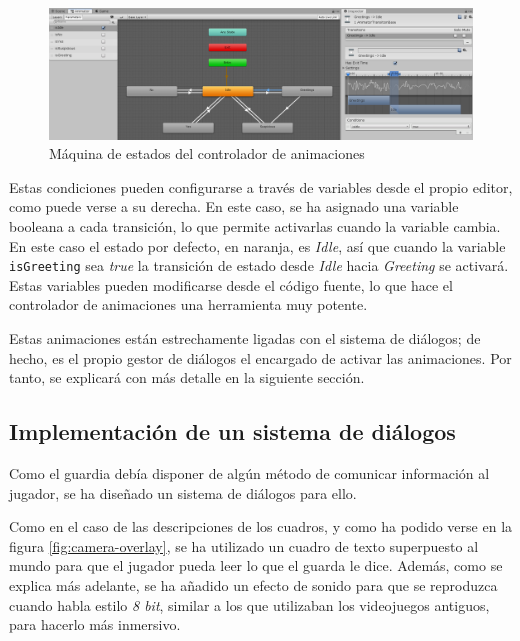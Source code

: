 \begin{figure}[!h]
\begin{center}
\includegraphics[width=1\textwidth]{imagenes/7/animator.png}
\caption{Máquina de estados del controlador de animaciones}
\label{fig:animator}
\end{center}
\end{figure}

Estas condiciones pueden configurarse a través de variables desde el propio editor, como puede verse a su derecha. En este caso, se ha asignado una variable booleana a cada transición, lo que permite activarlas cuando la variable cambia. En este caso el estado por defecto, en naranja, es \textit{Idle}, así que cuando la variable \texttt{isGreeting} sea \textit{true} la transición de estado desde \textit{Idle} hacia \textit{Greeting} se activará. Estas variables pueden modificarse desde el código fuente, lo que hace el controlador de animaciones una herramienta muy potente.

Estas animaciones están estrechamente ligadas con el sistema de diálogos; de hecho, es el propio gestor de diálogos el encargado de activar las animaciones. Por tanto, se explicará con más detalle en la siguiente sección.

\subsection{Implementación de un sistema de diálogos}

Como el guardia debía disponer de algún método de comunicar información al jugador, se ha diseñado un sistema de diálogos para ello. 

Como en el caso de las descripciones de los cuadros, y como ha podido verse en la figura \ref{fig:camera-overlay}, se ha utilizado un cuadro de texto superpuesto al mundo para que el jugador pueda leer lo que el guarda le dice. Además, como se explica más adelante, se ha añadido un efecto de sonido para que se reproduzca cuando habla estilo \textit{8 bit}, similar a los que utilizaban los videojuegos antiguos, para hacerlo más inmersivo.

